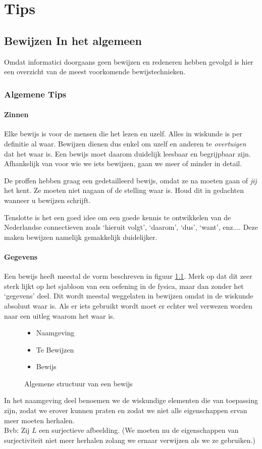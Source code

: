 \documentclass[lineaire_algebra_oplossingen.tex]{subfiles}
\begin{document}
\chapter{Tips}
\section{Bewijzen In het algemeen}
Omdat informatici doorgaans geen bewijzen en redeneren hebben gevolgd is hier een overzicht van de meest voorkomende bewijstechnieken.

\subsection{Algemene Tips}
\subsubsection{Zinnen}
Elke bewijs is voor de mensen die het lezen en uzelf. Alles in wiskunde is per definitie al waar. Bewijzen dienen dus enkel om uzelf en anderen te \emph{overtuigen} dat het waar is. Een bewijs moet daarom duidelijk leesbaar en begrijpbaar zijn. Afhankelijk van voor wie we iets bewijzen, gaan we meer of minder in detail. 

De proffen hebben graag een gedetailleerd bewijs, omdat ze na moeten gaan of \emph{jij} het kent. Ze moeten niet nagaan of de stelling waar is. Houd dit in gedachten wanneer u bewijzen schrijft.

Tenslotte is het een goed idee om een goede kennis te ontwikkelen van de Nederlandse connectieven zoals `hieruit volgt', `daarom', `dus', `want', enz.... Deze maken bewijzen namelijk gemakkelijk duidelijker.
\subsubsection{Gegevens}
Een bewijs heeft meestal de vorm beschreven in figuur \ref{algemeen_bewijs}. Merk op dat dit zeer sterk lijkt op het sjabloon van een oefening in de fysica, maar dan zonder het `gegevens' deel. Dit wordt meestal weggelaten in bewijzen omdat in de wiskunde absoluut waar is. Als er iets gebruikt wordt moet er echter wel verwezen worden naar een uitleg waarom het waar is.
\begin{figure}[H]
\begin{itemize}
\item Naamgeving
\item Te Bewijzen
\item Bewijs
\end{itemize}
\caption{Algemene structuur van een bewijs}
\label{algemeen_bewijs}
\end{figure}
In het naamgeving deel benoemen we de wiskundige elementen die van toepassing zijn, zodat we erover kunnen praten en zodat we niet alle eigenschappen ervan meer moeten herhalen.\\
Bvb: Zij $L$ een surjectieve afbeelding. (We moeten nu de eigenschappen van surjectiviteit niet meer herhalen zolang we ernaar verwijzen als we ze gebruiken.)
\end{document}
